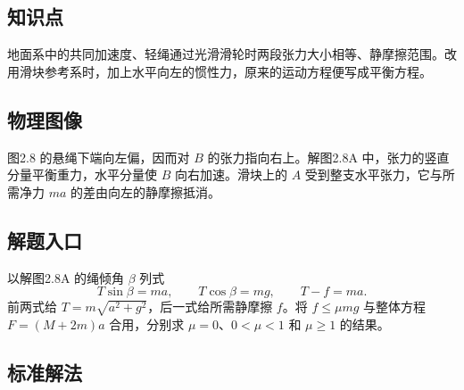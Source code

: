 \documentclass[UTF8,fontset=fandol,a4paper,11pt]{ctexart}
\begin{document}


\subsection*{知识点}

地面系中的共同加速度、轻绳通过光滑滑轮时两段张力大小相等、静摩擦范围。改用滑块参考系时，加上水平向左的惯性力，原来的运动方程便写成平衡方程。




\subsection*{物理图像}

图2.8 的悬绳下端向左偏，因而对 $B$ 的张力指向右上。解图2.8A 中，张力的竖直分量平衡重力，水平分量使 $B$ 向右加速。滑块上的 $A$ 受到整支水平张力，它与所需净力 $ma$ 的差由向左的静摩擦抵消。



\subsection*{解题入口}

以解图2.8A 的绳倾角 $\beta$ 列式
\[
T\sin\beta=ma,\qquad T\cos\beta=mg,\qquad T-f=ma.
\]
前两式给 $T=m\sqrt{a^2+g^2}$，后一式给所需静摩擦 $f$。将 $f\leq\mu mg$ 与整体方程 $F=(M+2m)a$ 合用，分别求 $\mu=0$、$0<\mu<1$ 和 $\mu\geq1$ 的结果。



\subsection*{标准解法}
\end{document}
